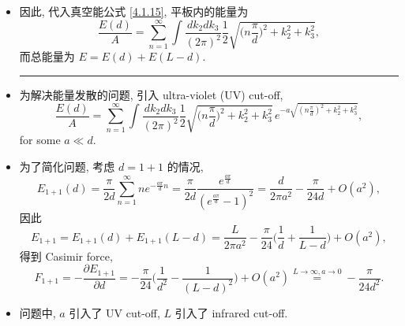 \begin{itemize}
	\item 因此, 代入真空能公式 \eqref{4.1.15}, 平板内的能量为
	\begin{equation}
		\frac{E(d)}{A} = \sum_{n = 1}^\infty \int \frac{dk_2 dk_3}{(2 \pi)^2} \frac{1}{2} \sqrt{\Big( n \frac{\pi}{d} \Big)^2 + k_2^2 + k_3^2},
	\end{equation}
	而总能量为 $E = E(d) + E(L - d)$.
	
	\noindent\rule[0.5ex]{\linewidth}{0.5pt} %
	
	\item 为解决能量发散的问题, 引入 ultra-violet (UV) cut-off,
	\begin{equation}
		\frac{E(d)}{A} = \sum_{n = 1}^\infty \int \frac{dk_2 dk_3}{(2 \pi)^2} \frac{1}{2} \sqrt{\Big( n \frac{\pi}{d} \Big)^2 + k_2^2 + k_3^2} \, e^{- a \sqrt{(n \frac{\pi}{d})^2 + k_2^2 + k_3^2}},
	\end{equation}
	for some $a \ll d$.
	
	\item 为了简化问题, 考虑 $d = 1 + 1$ 的情况,
	\begin{equation}
		E_{1 + 1}(d) = \frac{\pi}{2 d} \sum_{n = 1}^\infty n e^{- \frac{a \pi}{d} n} = \frac{\pi}{2 d} \frac{e^{\frac{a \pi}{d}}}{(e^{\frac{a \pi}{d}} - 1)^2} = \frac{d}{2 \pi a^2} - \frac{\pi}{24 d} + O(a^2),
	\end{equation}
	因此
	\begin{equation}
		E_{1 + 1} = E_{1 + 1}(d) + E_{1 + 1}(L - d) = \frac{L}{2 \pi a^2} - \frac{\pi}{24} \Big( \frac{1}{d} + \frac{1}{L - d} \Big) + O(a^2),
	\end{equation}
	得到 Casimir force,
	\begin{equation}
		F_{1 + 1} = - \frac{\partial E_{1 + 1}}{\partial d} = - \frac{\pi}{24} \Big( \frac{1}{d^2} - \frac{1}{(L - d)^2} \Big) + O(a^2) \overset{L \rightarrow \infty, a \rightarrow 0}{=} - \frac{\pi}{24 d^2}.
	\end{equation}
	
	\item 问题中, $a$ 引入了 UV cut-off, $L$ 引入了 infrared cut-off.
\end{itemize}
